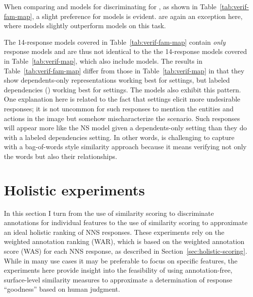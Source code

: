 When comparing  and  models for discriminating for , as shown in Table~\ref{tab:verif-fam-map}, a slight preference for  models is evident.  are again an exception here, where  models slightly outperform  models on this task.

The  14-response models covered in Table~\ref{tab:verif-fam-map} contain \textit{only}  response models and are thus not identical to the the  14-response models covered in Table~\ref{tab:verif-map}, which also include  models. The  results in Table~\ref{tab:verif-fam-map} differ from those in Table~\ref{tab:verif-map} in that they show dependents-only representations working best for   settings, but  labeled dependencies () working best for  settings. The  models also exhibit this pattern. One explanation here is related to the fact that   settings elicit more undesirable responses; it is not uncommon for such responses to mention the entities and actions in the image but somehow mischaracterize the scenario. Such responses will appear more like the NS model given a dependents-only setting than they do with a labeled dependencies setting. In other words,  is challenging to capture with a bag-of-words style similarity approach because it means verifying not only the words but also their relationships.


\section{Holistic experiments}
\label{sec:exp-holistic}
In this section I turn from the use of similarity scoring to discriminate annotations for individual features to the use of similarity scoring to approximate an ideal holistic ranking of NNS responses. These experiments rely on the weighted annotation ranking (WAR), which is based on the weighted annotation score (WAS) for each NNS response, as described in Section~\ref{sec:holistic-scoring}. While in many use cases it may be preferable to focus on specific features, the experiments here provide insight into the feasibility of using annotation-free, surface-level similarity measures to approximate a determination of response ``goodness'' based on human judgment.

